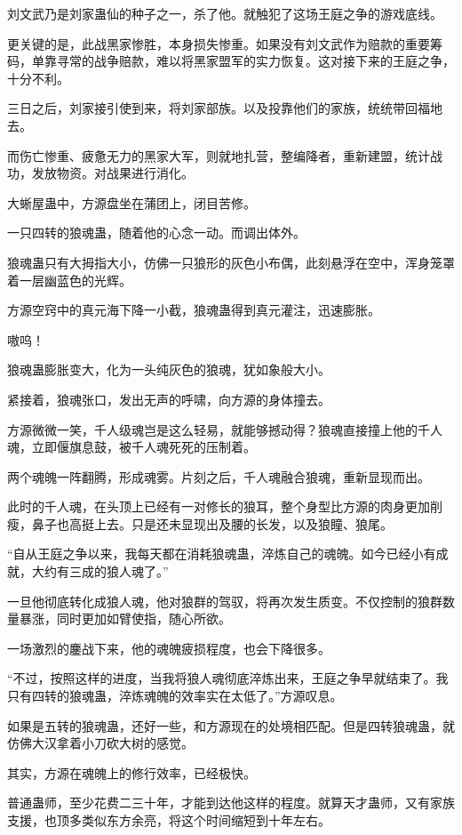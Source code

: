 \begin{this_body}
刘文武乃是刘家蛊仙的种子之一，杀了他。就触犯了这场王庭之争的游戏底线。

更关键的是，此战黑家惨胜，本身损失惨重。如果没有刘文武作为赔款的重要筹码，单靠寻常的战争赔款，难以将黑家盟军的实力恢复。这对接下来的王庭之争，十分不利。

三日之后，刘家接引使到来，将刘家部族。以及投靠他们的家族，统统带回福地去。

而伤亡惨重、疲惫无力的黑家大军，则就地扎营，整编降者，重新建盟，统计战功，发放物资。对战果进行消化。

大蜥屋蛊中，方源盘坐在蒲团上，闭目苦修。

一只四转的狼魂蛊，随着他的心念一动。而调出体外。

狼魂蛊只有大拇指大小，仿佛一只狼形的灰色小布偶，此刻悬浮在空中，浑身笼罩着一层幽蓝色的光辉。

方源空窍中的真元海下降一小截，狼魂蛊得到真元灌注，迅速膨胀。

嗷呜！

狼魂蛊膨胀变大，化为一头纯灰色的狼魂，犹如象般大小。

紧接着，狼魂张口，发出无声的呼啸，向方源的身体撞去。

方源微微一笑，千人级魂岂是这么轻易，就能够撼动得？狼魂直接撞上他的千人魂，立即偃旗息鼓，被千人魂死死的压制着。

两个魂魄一阵翻腾，形成魂雾。片刻之后，千人魂融合狼魂，重新显现而出。

此时的千人魂，在头顶上已经有一对修长的狼耳，整个身型比方源的肉身更加削瘦，鼻子也高挺上去。只是还未显现出及腰的长发，以及狼瞳、狼尾。

“自从王庭之争以来，我每天都在消耗狼魂蛊，淬炼自己的魂魄。如今已经小有成就，大约有三成的狼人魂了。”

一旦他彻底转化成狼人魂，他对狼群的驾驭，将再次发生质变。不仅控制的狼群数量暴涨，同时更加如臂使指，随心所欲。

一场激烈的鏖战下来，他的魂魄疲损程度，也会下降很多。

“不过，按照这样的进度，当我将狼人魂彻底淬炼出来，王庭之争早就结束了。我只有四转的狼魂蛊，淬炼魂魄的效率实在太低了。”方源叹息。

如果是五转的狼魂蛊，还好一些，和方源现在的处境相匹配。但是四转狼魂蛊，就仿佛大汉拿着小刀砍大树的感觉。

其实，方源在魂魄上的修行效率，已经极快。

普通蛊师，至少花费二三十年，才能到达他这样的程度。就算天才蛊师，又有家族支援，也顶多类似东方余亮，将这个时间缩短到十年左右。


\end{this_body}
